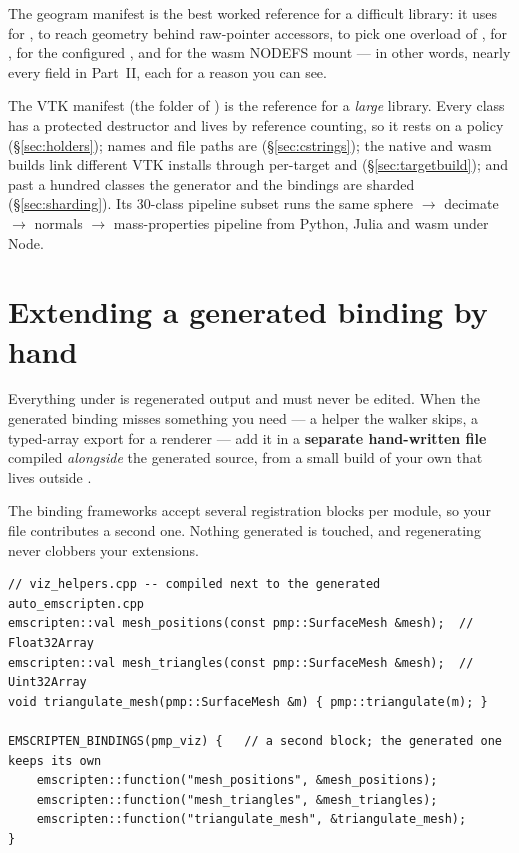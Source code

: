 The geogram manifest is the best worked reference for a difficult library: it
uses  for ,  to reach
geometry behind raw-pointer accessors,  to pick one overload of
,  for ,
 for the configured , and
 for the wasm NODEFS mount --- in other words, nearly every
field in Part~II, each for a reason you can see.

The VTK manifest (the  folder of ) is the
reference for a \emph{large} library. Every class has a protected destructor
and lives by reference counting, so it rests on a  policy
(\S\ref{sec:holders}); names and file paths are 
(\S\ref{sec:cstrings}); the native and wasm builds link different VTK
installs through per-target  and 
(\S\ref{sec:targetbuild}); and past a hundred classes the generator and the
bindings are sharded (\S\ref{sec:sharding}). Its 30-class pipeline subset runs
the same sphere $\to$ decimate $\to$ normals $\to$ mass-properties pipeline
from Python, Julia and wasm under Node.

\section{Extending a generated binding by hand}

Everything under  is regenerated output and must never be
edited. When the generated binding misses something you need --- a helper the
walker skips, a typed-array export for a renderer --- add it in a
\textbf{separate hand-written file} compiled \emph{alongside} the generated
source, from a small build of your own that lives outside .

The binding frameworks accept several registration blocks per module, so your
file contributes a second one. Nothing generated is touched, and regenerating
never clobbers your extensions.

\begin{lstlisting}[style=cpp]
// viz_helpers.cpp -- compiled next to the generated auto_emscripten.cpp
emscripten::val mesh_positions(const pmp::SurfaceMesh &mesh);  // Float32Array
emscripten::val mesh_triangles(const pmp::SurfaceMesh &mesh);  // Uint32Array
void triangulate_mesh(pmp::SurfaceMesh &m) { pmp::triangulate(m); }

EMSCRIPTEN_BINDINGS(pmp_viz) {   // a second block; the generated one keeps its own
    emscripten::function("mesh_positions", &mesh_positions);
    emscripten::function("mesh_triangles", &mesh_triangles);
    emscripten::function("triangulate_mesh", &triangulate_mesh);
}
\end{lstlisting}

